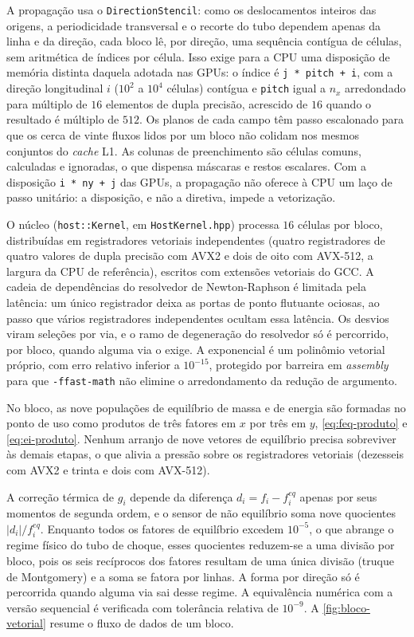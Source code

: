 A propagação usa o \texttt{DirectionStencil}: como os deslocamentos inteiros das origens, a periodicidade transversal e o recorte do tubo dependem apenas da linha e da direção, cada bloco lê, por direção, uma sequência contígua de células, sem aritmética de índices por célula.
Isso exige para a CPU uma disposição de memória distinta daquela adotada nas GPUs: o índice é \texttt{j * pitch + i}, com a direção longitudinal $i$ ($10^2$ a $10^4$ células) contígua e \texttt{pitch} igual a $n_x$ arredondado para múltiplo de $16$ elementos de dupla precisão, acrescido de $16$ quando o resultado é múltiplo de $512$.
Os planos de cada campo têm passo escalonado para que os cerca de vinte fluxos lidos por um bloco não colidam nos mesmos conjuntos do \textit{cache} L1.
As colunas de preenchimento são células comuns, calculadas e ignoradas, o que dispensa máscaras e restos escalares.
Com a disposição \texttt{i * ny + j} das GPUs, a propagação não oferece à CPU um laço de passo unitário: a disposição, e não a diretiva, impede a vetorização.

O núcleo (\texttt{host::Kernel}, em \texttt{HostKernel.hpp}) processa $16$ células por bloco, distribuídas em registradores vetoriais independentes (quatro registradores de quatro valores de dupla precisão com AVX2 e dois de oito com AVX-512, a largura da CPU de referência), escritos com extensões vetoriais do GCC.
A cadeia de dependências do resolvedor de Newton-Raphson é limitada pela latência: um único registrador deixa as portas de ponto flutuante ociosas, ao passo que vários registradores independentes ocultam essa latência.
Os desvios viram seleções por via, e o ramo de degeneração do resolvedor só é percorrido, por bloco, quando alguma via o exige.
A exponencial é um polinômio vetorial próprio, com erro relativo inferior a $10^{-15}$, protegido por barreira em \textit{assembly} para que \texttt{-ffast-math} não elimine o arredondamento da redução de argumento.

No bloco, as nove populações de equilíbrio de massa e de energia são formadas no ponto de uso como produtos de três fatores em $x$ por três em $y$, \eqref{eq:feq-produto} e \eqref{eq:ei-produto}.
Nenhum arranjo de nove vetores de equilíbrio precisa sobreviver às demais etapas, o que alivia a pressão sobre os registradores vetoriais (dezesseis com AVX2 e trinta e dois com AVX-512).

A correção térmica de $g_i$ depende da diferença $d_i = f_i - f_i^{eq}$ apenas por seus momentos de segunda ordem, e o sensor de não equilíbrio soma nove quocientes $|d_i|/f_i^{eq}$.
Enquanto todos os fatores de equilíbrio excedem $10^{-5}$, o que abrange o regime físico do tubo de choque, esses quocientes reduzem-se a uma divisão por bloco, pois os seis recíprocos dos fatores resultam de uma única divisão (truque de Montgomery) e a soma se fatora por linhas.
A forma por direção só é percorrida quando alguma via sai desse regime.
A equivalência numérica com a versão sequencial é verificada com tolerância relativa de $10^{-9}$.
A \autoref{fig:bloco-vetorial} resume o fluxo de dados de um bloco.

